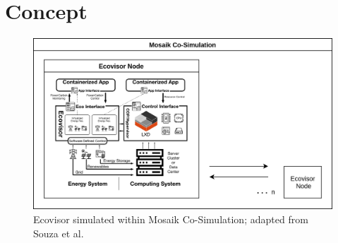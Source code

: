 \documentclass[aspectratio=169, 10pt]{beamer}
\def\textwidth{}%
\begin{document}
\section{Concept}
\begin{frame}
    \begin{figure}
    \begin{minipage}{\textwidth}
        \hspace{6.7mm}\includegraphics[width=.65\textwidth]{../sketch.png}
        \caption{Ecovisor simulated within Mosaik Co-Simulation; adapted from
        Souza et al. \cite{souza2022}}
    \end{minipage}
    \end{figure}
\end{frame}
\end{document}
